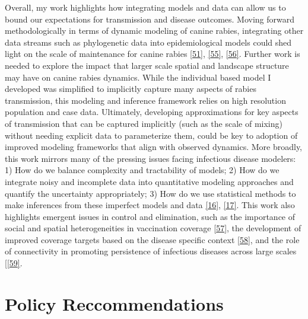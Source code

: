 \documentclass[
  oneside]{book}
\begin{document}
Overall, my work highlights how integrating models and data can allow us to bound our expectations for transmission and disease outcomes. Moving forward methodologically in terms of dynamic modeling of canine rabies, integrating other data streams such as phylogenetic data into epidemiological models could shed light on the scale of maintenance for canine rabies \protect\hyperlink{ref-bourhy2016}{{[}51{]}}, \protect\hyperlink{ref-brunker2018}{{[}55{]}}, \protect\hyperlink{ref-dellicour2017}{{[}56{]}}. Further work is needed to explore the impact that larger scale spatial and landscape structure may have on canine rabies dynamics. While the individual based model I developed was simplified to implicitly capture many aspects of rabies transmission, this modeling and inference framework relies on high resolution population and case data. Ultimately, developing approximations for key aspects of transmission that can be captured implicitly (such as the scale of mixing) without needing explicit data to parameterize them, could be key to adoption of improved modeling frameworks that align with observed dynamics. More broadly, this work mirrors many of the pressing issues facing infectious disease modelers: 1) How do we balance complexity and tractability of models; 2) How do we integrate noisy and incomplete data into quantitative modeling approaches and quantify the uncertainty appropriately; 3) How do we use statistical methods to make inferences from these imperfect models and data \protect\hyperlink{ref-funk2020}{{[}16{]}}, \protect\hyperlink{ref-park2020}{{[}17{]}}. This work also highlights emergent issues in control and elimination, such as the importance of social and spatial heterogeneities in vaccination coverage \protect\hyperlink{ref-takahashi2017}{{[}57{]}}, the development of improved coverage targets based on the disease specific context \protect\hyperlink{ref-funk2019}{{[}58{]}}, and the role of connectivity in promoting persistence of infectious diseases across large scales {[}\protect\hyperlink{ref-kraemer2018}{{[}59{]}}.

\hypertarget{policy-reccommendations}{%
\section{Policy Reccommendations}\label{policy-reccommendations}}
\end{document}
